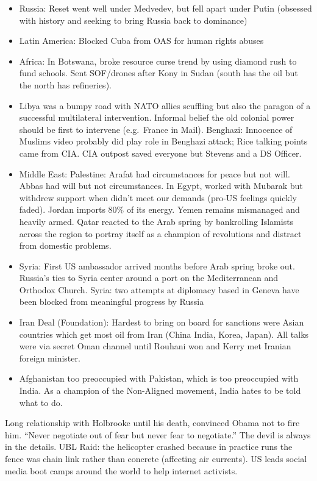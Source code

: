 \documentclass[
]{article}
\begin{document}
\begin{itemize}
\item
  Russia: Reset went well under Medvedev, but fell apart under Putin
  (obsessed with history and seeking to bring Russia back to dominance)
\item
  Latin America: Blocked Cuba from OAS for human rights abuses
\item
  Africa: In Botswana, broke resource curse trend by using diamond rush
  to fund schools. Sent SOF/drones after Kony in Sudan (south has the
  oil but the north has refineries).
\item
  Libya was a bumpy road with NATO allies scuffling but also the paragon
  of a successful multilateral intervention. Informal belief the old
  colonial power should be first to intervene (e.g.~France in Mail).
  Benghazi: Innocence of Muslims video probably did play role in
  Benghazi attack; Rice talking points came from CIA. CIA outpost saved
  everyone but Stevens and a DS Officer.
\item
  Middle East: Palestine: Arafat had circumstances for peace but not
  will. Abbas had will but not circumstances. In Egypt, worked with
  Mubarak but withdrew support when didn't meet our demands (pro-US
  feelings quickly faded). Jordan imports 80\% of its energy. Yemen
  remains mismanaged and heavily armed. Qatar reacted to the Arab spring
  by bankrolling Islamists across the region to portray itself as a
  champion of revolutions and distract from domestic problems.
\item
  Syria: First US ambassador arrived months before Arab spring broke
  out. Russia's ties to Syria center around a port on the Mediterranean
  and Orthodox Church. Syria: two attempts at diplomacy based in Geneva
  have been blocked from meaningful progress by Russia
\item
  Iran Deal (Foundation): Hardest to bring on board for sanctions were
  Asian countries which get most oil from Iran (China India, Korea,
  Japan). All talks were via secret Oman channel until Rouhani won and
  Kerry met Iranian foreign minister.
\item
  Afghanistan too preoccupied with Pakistan, which is too preoccupied
  with India. As a champion of the Non-Aligned movement, India hates to
  be told what to do.
\end{itemize}

Long relationship with Holbrooke until his death, convinced Obama not to
fire him. ``Never negotiate out of fear but never fear to negotiate.''
The devil is always in the details. UBL Raid: the helicopter crashed
because in practice runs the fence was chain link rather than concrete
(affecting air currents). US leads social media boot camps around the
world to help internet activists.
\end{document}
